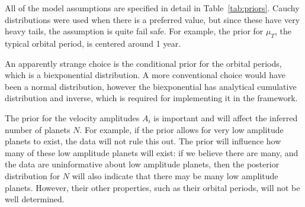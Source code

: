 \documentclass[useAMS,usenatbib]{mn2e}
\begin{document}
All of the model assumptions are specified in detail in
Table~\ref{tab:priors}. Cauchy distributions were used when there is a
preferred value, but since these have very heavy tails, the assumption is
quite fail safe. For example, the prior for $\mu_T$, the typical orbital period,
is centered around 1 year.

An apparently strange choice is the conditional prior for the orbital
periods, which is a biexponential distribution. A more conventional choice
would have been a normal distribution, however the biexponential has
analytical cumulative distribution and inverse, which is required for
implementing it in the \citet{rjobject} framework.

The prior for the velocity amplitudes $A_i$ is important and will affect the
inferred number of planets $N$. For example, if the prior allows for very
low amplitude planets to exist, the data will not rule this out. The prior
will influence how many of these low amplitude planets will exist: if we
believe there are many, and the data are uninformative about low amplitude
planets, then the posterior distribution for $N$ will also indicate that there
may be many low amplitude planets. However, their other properties, such as
their orbital periods, will not be well determined.
\end{document}

